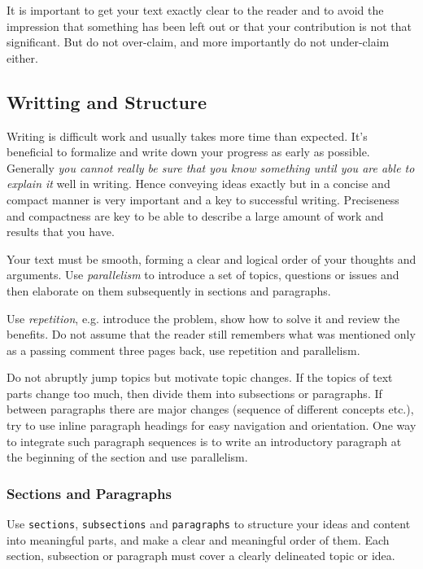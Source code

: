 \documentclass[11pt, a4paper,oneside,chapterprefix=false]{scrbook}
\begin{document}
It is important to get your text exactly clear to the reader and to avoid the impression that something has been left out or that your contribution is not that significant. But do not over-claim, and more importantly do not under-claim either.

\subsection*{Writting and Structure}

Writing is difficult work and usually takes more time than expected. It's beneficial to formalize and write down your progress as early as possible. Generally \emph{you cannot really be sure that you know something until you are able to explain it} well in writing. Hence conveying ideas exactly but in a concise and compact manner is very important and a key to successful writing. Preciseness and compactness are key to be able to describe a large amount of work and results that you have.

Your text must be smooth, forming a clear and logical order of your thoughts and arguments. Use \emph{parallelism} to introduce a set of topics, questions or issues and then elaborate on them subsequently in sections and paragraphs.

Use \emph{repetition}, e.g. introduce the problem, show how to solve it and review the benefits. Do not assume that the reader still remembers what was mentioned only as a passing comment three pages back, use repetition and parallelism.

Do not abruptly jump topics but motivate topic changes. If the topics of text parts change too much, then divide them into subsections or paragraphs. If between paragraphs there are major changes (sequence of different concepts etc.), try to use inline paragraph headings for easy navigation and orientation. One way to integrate such paragraph sequences is to write an introductory paragraph at the beginning of the section and use parallelism.

\subsubsection*{Sections and Paragraphs}

Use \texttt{sections}, \texttt{subsections} and \texttt{paragraphs} to structure your ideas and content into meaningful parts, and make a clear and meaningful order of them. Each section, subsection or paragraph must cover a clearly delineated topic or idea.
\end{document}
